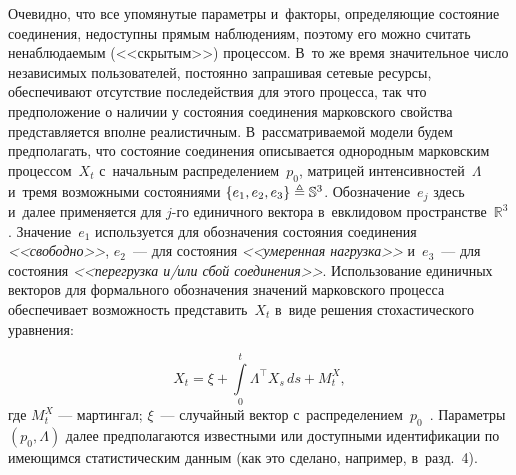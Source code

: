 \begin{multicols}{2}
Очевидно, что все упомянутые параметры и~факторы, определяющие
состояние соединения, недоступны прямым наблюдениям, поэтому его
можно считать ненаблюдаемым (<<скрытым>>) процессом. В~то же время
значительное число независимых пользователей, постоянно запрашивая
сетевые ресурсы, обеспечивают отсутствие последействия для этого
процесса, так что предположение о наличии у состояния соединения
марковского свойства представляется вполне реалистичным. 
В~рассматриваемой модели будем предполагать, что состояние соединения
описывается однородным марковским процессом~$X_t$ с~начальным
распределением~$p_0$, матрицей интенсивностей~$\Lambda$ и~тремя
возможными состояниями $\{e_1, e_2, e_3\} \triangleq \mathbb{S}^3$.
Обозначение~$e_j$ здесь и~далее применяется для $j$-го единичного
вектора в~евклидовом пространстве~$\mathbb{R}^3$. Значение~$e_1$
используется для обозначения состояния соединения {\it<<свободно>>},
$e_2$~--- для состояния {\it<<умеренная нагрузка>>} и~$e_3$~--- для
состояния {\it<<перегрузка и/или сбой соединения>>}. Использование
единичных векторов для формального обозначения значений марковского
процесса обеспечивает возможность представить~$X_t$ в~виде решения
стохастического уравнения:

\noindent
\begin{equation}
X_t = \xi + \int\limits_0^t \Lambda^{\top}X_s\,ds+M^X_t, 
\label{eq:state}
\end{equation}
где $M^X_t$ --- мартингал; $\xi$~--- случайный вектор 
с~распределением~$p_0$~\cite{EAM_94}. Параметры $(p_0,\Lambda)$ далее
предполагаются известными или доступными идентификации по имеющимся
статистическим данным (как это сделано, например, в~разд.~4).


\end{multicols}
